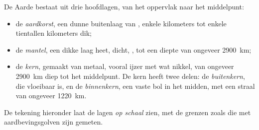 \begin{definition}\label{def:g6:inside-the-earth:layers}
De Aarde bestaat uit drie hoofdlagen, van het oppervlak naar het
middelpunt:
\begin{itemize}
  \item de \emph{aardkorst}, een dunne buitenlaag van , enkele kilometers tot enkele tientallen kilometers dik;
  \item de \emph{mantel}, een dikke laag heet, dicht, , tot een diepte van ongeveer 2900~km;
  \item de \emph{kern}, gemaakt van metaal, vooral ijzer met wat
        nikkel, van ongeveer 2900~km diep tot het middelpunt. De kern heeft
        twee delen: de \emph{buitenkern}, die vloeibaar
        is, en de \emph{binnenkern}, een vaste bol in het
        midden, met een straal van ongeveer 1220~km.
\end{itemize}
\end{definition}

De tekening hieronder laat de lagen \emph{op schaal} zien, met de grenzen
zoals die met aardbevingsgolven zijn gemeten.

